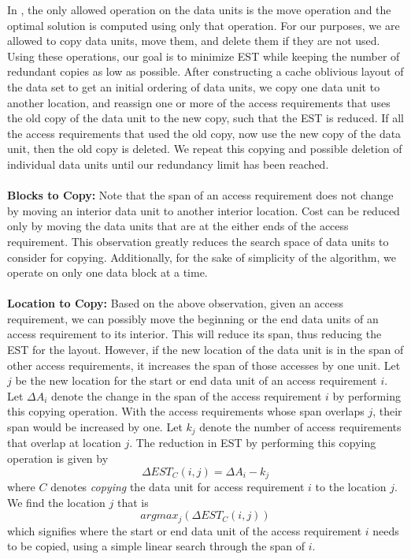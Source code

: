 In \cite{cacheobliviouslayout}, the only allowed operation on the data units is
the move operation and the optimal solution is computed using only that
operation. For our purposes, we are allowed to copy data units, move them, and
delete them if they are not used. Using these operations, our goal is to minimize EST
while keeping the number of redundant copies as low as possible. After constructing a cache oblivious layout 
of the data set to get an initial ordering of data units, we copy one data unit to another location, and reassign 
one or more of the access requirements that uses the old copy of the data unit to the new copy, such that the EST is reduced. 
If all the access requirements that used the old copy, now use the new copy of the data unit, then the old copy is deleted. 
We repeat this copying and possible deletion of individual data units until our redundancy limit has been reached. \\
\\
{\bf Blocks to Copy:} Note that the span of an access requirement does not
change by moving an interior data unit to another interior location. Cost can
be reduced only by moving the data units that are at the either ends of the access
requirement. This observation greatly reduces the search space of data units to
consider for copying. Additionally, for the sake of simplicity of the algorithm, we operate
on only one data block at a time. \\
\\
{\bf Location to Copy:} Based on the above observation, given an access requirement, we can possibly move the beginning or the end data units of an access requirement to its interior. This will reduce its span, thus reducing the EST for the layout. However, if the new location of the data unit is in the span of other access requirements, it increases the span of those accesses by one unit. Let $j$ be the new location for the start or end data unit of an access requirement $i$. Let $\Delta A_i$ denote the change in the span of the access requirement $i$ by performing this copying operation. With the access requirements whose span overlaps $j$, their span would be increased by one. Let  $k_j$ denote the number of access requirements that overlap at location $j$.  The reduction in EST by performing this copying operation is given by 
\[ 
\Delta EST_C(i,j) = \Delta A_i - k_j 
\]
where $C$ denotes {\it copying} the data unit for access requirement $i$ to the location $j$. We find the location $j$ that is 
\[
argmax_j(\Delta EST_C(i,j))
\]
which signifies where the start or end data unit of the access requirement $i$ needs to be copied, using a simple linear search through the span of $i$. \\
